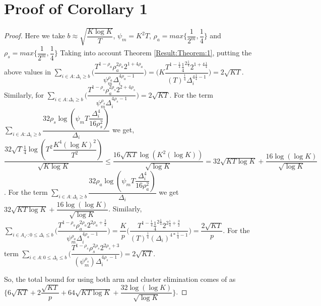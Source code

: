 \section{Proof of Corollary 1}
\label{App:Proof:Corollary:1}
\begin{proof}
Here we take $b\approx\sqrt{\dfrac{K\log K}{T}}$, $\psi_{m}=K^{2}T$, $\rho_{a}=max\bigg\lbrace\dfrac{1}{2^{m}},\dfrac{1}{4}\bigg\rbrace$ and $\rho_{s}=max\bigg\lbrace\dfrac{1}{2^{m}},\dfrac{1}{4}\bigg\rbrace$
 Taking into account Theorem \ref{Result:Theorem:1}, putting the above values in $\sum_{i\in A:\Delta_{i}\geq b}\bigg(\dfrac{T^{1-\rho_{a}}\rho_{a}^{2\rho_{a}}2^{1+4\rho_{a}}}{\psi_{m}^{\rho_{a}}\Delta_{i}^{4\rho_{a}-1}} \bigg)= \bigg(K\dfrac{T^{1-\frac{1}{4}}\frac{1}{4}^{2\frac{1}{4}}2^{1+4\frac{1}{4}}}{(T)^{\frac{1}{4}}\Delta_{i}^{4\frac{1}{4}-1}} \bigg)= 2\sqrt{KT}$. Similarly, for $\sum_{i\in A:\Delta_{i}\geq b}\bigg(\dfrac{T^{1-\rho_{s}}\rho_{a}^{2\rho_{s}}2^{2+4\rho_{s}}}{\psi_{m}^{\rho_{s}}\Delta_{i}^{4\rho_{s}-1}} \bigg) = 2\sqrt{KT}$.
 For the term $\sum_{i\in A:\Delta_{i}\geq b}\dfrac{32\rho_{s}\log{(\psi_{m}T\dfrac{\Delta_{i}^{4}}{16\rho_{s}^{2}})}}{\Delta_{i}}$ we get,
$\dfrac{32\sqrt{T}\frac{1}{4}\log{(T^{2}\dfrac{K^{4}(\log K)^{2}}{T^{2}})}}{\sqrt{K\log K}} \leq \dfrac{16\sqrt{KT}\log{(K^{2}(\log K))}}{\sqrt{\log K}}=32\sqrt{KT\log K} + \dfrac{16\log{(\log K)}}{\sqrt{\log K}}$. For the term $\sum_{i\in A:\Delta_{i}\geq b}\dfrac{32\rho_{a}\log{(\psi_{m}T\dfrac{\Delta_{i}^{4}}{16\rho_{a}^{2}})}}{\Delta_{i}}$ we get $32\sqrt{KT\log K} + \dfrac{16\log{(\log K)}}{\sqrt{\log K}}$.
 Similarly, $\sum\limits_{i\in A_{s^{*}}:0\leq\Delta_{i}\leq b}\bigg(\dfrac{T^{1-\rho_{a}}\rho_{a}^{2\rho_{a}}2^{2\rho_{a}+\frac{3}{2}}}{\psi_{m}^{\rho_{a}}\Delta_{i}^{4\rho_{a}-1}} \bigg)=\dfrac{K}{p}\bigg(\dfrac{T^{1-\frac{1}{4}}\frac{1}{4}^{2\frac{1}{4}}2^{2\frac{1}{4}+\frac{3}{2}}}{{(T)^{\frac{1}{4}}}{(\Delta_{i})^{4*\frac{1}{4}-1}}} \bigg) = \dfrac{2 \sqrt{KT} }{p}$. For the term $\sum\limits_{i\in A:0\leq\Delta_{i}\leq b}\bigg(\dfrac{T^{1-\rho_{s}}\rho_{s}^{2\rho_{s}}2^{2\rho_{s}+3}}{(\psi_{m}^{\rho_{s}})\Delta_{i}^{4\rho_{s} -1}} \bigg)= 2 \sqrt{KT} $.

 So, the total bound for using both arm and cluster elimination comes of as $\bigg\lbrace 6\sqrt{KT} + 2\dfrac{\sqrt{KT}}{p} + 64\sqrt{KT\log K} + \dfrac{32\log{(\log K)}}{\sqrt{\log K}}\bigg\rbrace$.
\end{proof}


